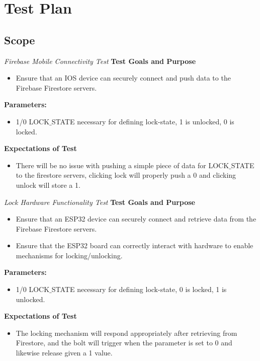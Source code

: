 \section{Test Plan}

\subsection{Scope}
\Large 
\textit{Firebase Mobile Connectivity Test}
\newline
\newline
\normalsize
\textbf{Test Goals and Purpose} 
\begin{itemize}
    
    \item Ensure that an IOS device can securely connect and push data to the Firebase Firestore servers.

\end{itemize}
\textbf{Parameters:}
\begin{itemize}

\item 1/0 LOCK$\_$STATE necessary for defining lock-state, 1 is unlocked, 0 is locked.

\end{itemize}
\textbf{Expectations of Test}
\begin{itemize}

\item There will be no issue with pushing a simple piece of data for LOCK$\_$STATE to the firestore servers, clicking lock will properly push a 0 and clicking unlock will store a 1.

\end{itemize}
\Large
\textit{Lock Hardware Functionality Test}
\newline
\newline
\normalsize
\textbf{Test Goals and Purpose}
\begin{itemize}
    \item Ensure that an ESP32 device can securely connect and retrieve data from the Firebase Firestore servers.
    \item Ensure that the ESP32 board can correctly interact with hardware to enable mechanisms for locking/unlocking.
\end{itemize}
\textbf{Parameters:}
\begin{itemize}

\item 1/0 LOCK$\_$STATE necessary for defining lock-state, 0 is locked, 1 is unlocked.

\end{itemize}
\textbf{Expectations of Test}
\begin{itemize}

\item The locking mechanism will respond appropriately after retrieving from Firestore, and the bolt will trigger when the parameter is set to 0 and likewise release given a 1 value.

\end{itemize}
